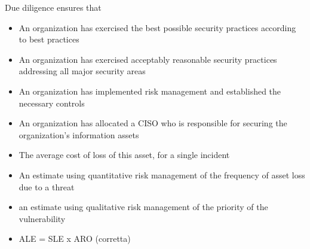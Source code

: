 Due diligence ensures that

\begin{itemize}
\item An organization has exercised the best possible security practices
according to best practices
\item An organization has exercised acceptably reasonable security practices
addressing all major security areas
\item An organization has implemented risk management and established the
necessary controls
\item An organization has allocated a CISO who is responsible for securing the
organization's information assets
\end{itemize}


\begin{itemize}
\item The average cost of loss of this asset, for a single incident
\item An estimate using quantitative risk management of the frequency of asset
loss due to a threat
\item an estimate using qualitative risk management of the priority of the
vulnerability
\item ALE = SLE x ARO (corretta)
\end{itemize}
